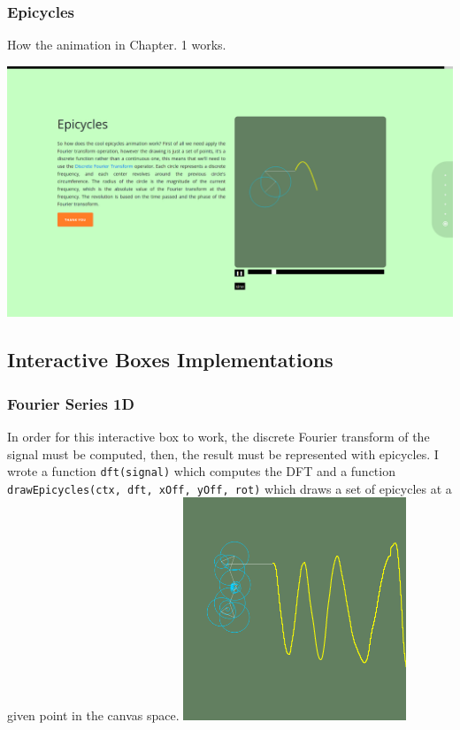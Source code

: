 \documentclass{article}
\begin{document}
\subsubsection{Epicycles}

How the animation in Chapter. 1 works.

\includegraphics[width=\textwidth]{chap17.png}

\pagebreak

\subsection{Interactive Boxes Implementations}


\subsubsection{Fourier Series 1D}

\begin{multicols}{2}
    In order for this interactive box to work, the discrete Fourier transform
    of the signal must be computed, then, the result must be represented with epicycles.
    I wrote a function \texttt{dft(signal)} which computes the DFT and a function
    \texttt{drawEpicycles(ctx, dft, xOff, yOff, rot)} which draws a set of epicycles at a
    given point in the canvas space.
    \includegraphics[width=0.5\textwidth]{fourierseries1d.png}
\end{multicols}
\end{document}
